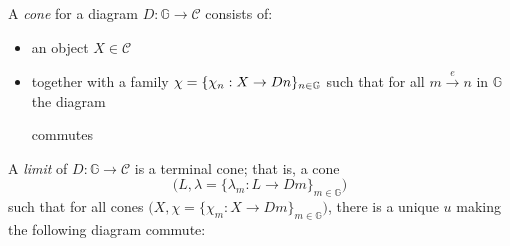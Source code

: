 \begin{definition}
A \emph{cone} for a diagram $D:\mathbb{G} \to \mathcal{C}$ consists of:
\begin{itemize}
\item an object $X \in \mathcal{C}$
\item together with a family 
$\chi = \{ \chi_n: X \to Dn \}_{n \in \mathbb{G}}$ such that for all 
$m \xrightarrow{e} n$ in $\mathbb{G}$ the diagram 
\begin{center}
\end{center}
commutes
\end{itemize}

A \emph{limit} of $D: \mathbb{G} \to \mathcal{C}$ is a terminal cone; that is,
a cone 
\[
\big(L, \lambda = \big\{ \lambda_m: L \to D m \big\}_{m \in \mathbb{G}}\big)
\]
such that for all cones
$\big(X, \chi = \big\{ \chi_m: X \to D m \big\}_{m \in \mathbb{G}}\big)$,
there is a unique $u$ making the following diagram commute:
\begin{center}
\end{center}
\end{definition}

